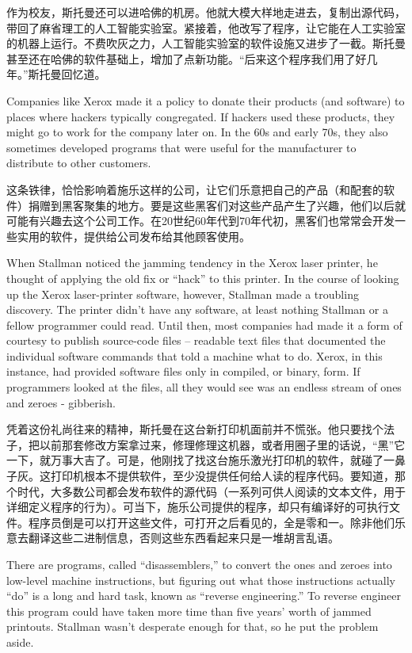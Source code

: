 \ifdefined\chs
作为校友，斯托曼还可以进哈佛的机房。他就大模大样地走进去，复制出源代码，带回了麻省理工的人工智能实验室。紧接着，他改写了程序，让它能在人工实验室的机器上运行。不费吹灰之力，人工智能实验室的软件设施又进步了一截。斯托曼甚至还在哈佛的软件基础上，增加了点新功能。``后来这个程序我们用了好几年。''斯托曼回忆道。
\fi
\fi

\ifdefined\vtwo
\ifdefined\eng
Companies like Xerox made it a policy to donate their products (and software) to places where hackers typically congregated. If hackers used these products, they might go to work for the company later on. In the 60s and early 70s, they also sometimes developed programs that were useful for the manufacturer to distribute to other customers.
\fi

\ifdefined\chs
这条铁律，恰恰影响着施乐这样的公司，让它们乐意把自己的产品（和配套的软件）捐赠到黑客聚集的地方。要是这些黑客们对这些产品产生了兴趣，他们以后就可能有兴趣去这个公司工作。在20世纪60年代到70年代初，黑客们也常常会开发一些实用的软件，提供给公司发布给其他顾客使用。
\fi

\ifdefined\eng
When Stallman noticed the jamming tendency in the Xerox laser printer, he thought of applying the old fix or ``hack'' to this printer. In the course of looking up the Xerox laser-printer software, however, Stallman made a troubling discovery. The printer didn't have any software, at least nothing Stallman or a fellow programmer could read. Until then, most companies had made it a form of courtesy to publish source-code files -- readable text files that documented the individual software commands that told a machine what to do. Xerox, in this instance, had provided software files only in compiled, or binary, form. If programmers looked at the files, all they would see was an endless stream of ones and zeroes - gibberish.
\fi

\ifdefined\chs
凭着这份礼尚往来的精神，斯托曼在这台新打印机面前并不慌张。他只要找个法子，把以前那套修改方案拿过来，修理修理这机器，或者用圈子里的话说，``黑''它一下，就万事大吉了。可是，他刚找了找这台施乐激光打印机的软件，就碰了一鼻子灰。这打印机根本不提供软件，至少没提供任何给人读的程序代码。要知道，那个时代，大多数公司都会发布软件的源代码（一系列可供人阅读的文本文件，用于详细定义程序的行为）。可当下，施乐公司提供的程序，却只有编译好的可执行文件。程序员倒是可以打开这些文件，可打开之后看见的，全是零和一。除非他们乐意去翻译这些二进制信息，否则这些东西看起来只是一堆胡言乱语。
\fi

\ifdefined\eng
There are programs, called ``disassemblers,'' to convert the ones and zeroes into low-level machine instructions, but figuring out what those instructions actually ``do'' is a long and hard task, known as ``reverse engineering.''  To reverse engineer this program could have taken more time than five years' worth of jammed printouts.  Stallman wasn't desperate enough for that, so he put the problem aside.
\fi

